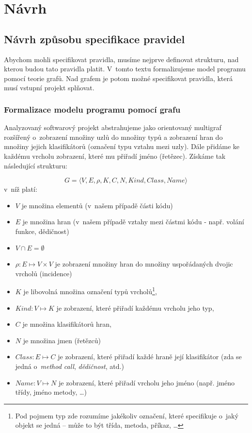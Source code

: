\chapter{Návrh}

\section{Návrh způsobu specifikace pravidel}

Abychom mohli specifikovat pravidla, musíme nejprve definovat strukturu, nad kterou budou tato pravidla platit. V~tomto textu formalizujeme model programu pomocí teorie grafů. Nad grafem je potom možné specifikovat pravidla, která musí vstupní projekt splňovat.

\subsection{Formalizace modelu programu pomocí grafu}
\label{design-graph_formalization}

Analyzovaný softwarový projekt abstrahujeme jako orientovaný multigraf rozšířený o~zobrazení množiny uzlů do množiny typů a zobrazení hran do množiny jejich klasifikátorů (označení typu vztahu mezi uzly). Dále přidáme ke každému vrcholu zobrazení, které mu přiřadí jméno (řetězec). Získáme tak následující strukturu:

\begin{displaymath}
  G = \langle V, E, \rho, K, C, N, \mathit{Kind}, \mathit{Class}, \mathit{Name}\rangle
  \label{extended_multigraph}
\end{displaymath}
v~níž platí:
\begin{itemize}
\item $V$ je množina elementů (v~našem případě části kódu)
\item $E$ je množina hran (v~našem případě vztahy mezi částmi kódu - např. volání funkce, dědičnost)
\item $V \cap E = \emptyset$
\item $\rho: E \mapsto V \times V$ je zobrazení množiny hran do množiny uspořádaných dvojic vrcholů (incidence)
\item $K$ je libovolná množina označení typů vrcholů\footnote{Pod pojmem typ zde rozumíme jakékoliv označení, které specifikuje o~jaký objekt se jedná -- může to být třída, metoda, příkaz, \ldots},
\item $\mathit{Kind}: V \mapsto K$ je zobrazení, které přiřadí každému vrcholu jeho typ,
\item $C$ je množina klasifikátorů hran,
\item $N$ je množina jmen (řetězců)
\item $\mathit{Class}: E \mapsto C$ je zobrazení, které přiřadí každé hraně její klasifikátor (zda se jedná o~\emph{method call}, \emph{dědičnost}, atd.)
\item $\mathit{Name}: V \mapsto N$ je zobrazení, které přiřadí vrcholu jeho jméno (např. jméno třídy, jméno metody, \ldots)
\end{itemize}

